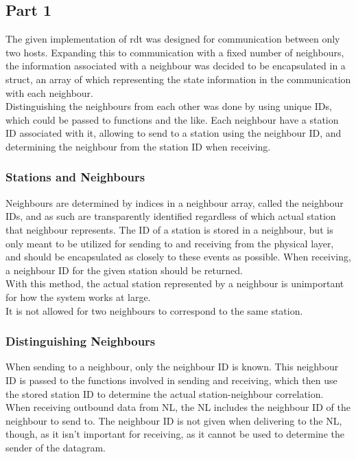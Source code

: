 \subsection{Part 1}
The given implementation of rdt was designed for communication between only two hosts. Expanding this to communication with a fixed number of neighbours, the information associated with a neighbour was decided to be encapsulated in a struct, an array of which representing the state information in the communication with each neighbour.\\
Distinguishing the neighbours from each other was done by using unique IDs, which could be passed to functions and the like. Each neighbour have a station ID associated with it, allowing to send to a station using the neighbour ID, and determining the neighbour from the station ID when receiving.

\subsubsection{Stations and Neighbours}
Neighbours are determined by indices in a neighbour array, called the neighbour IDs, and as such are transparently identified regardless of which actual station that neighbour represents. The ID of a station is stored in a neighbour, but is only meant to be utilized for sending to and receiving from the physical layer, and should be encapsulated as closely to these events as possible. When receiving, a neighbour ID for the given station should be returned.\\
With this method, the actual station represented by a neighbour is unimportant for how the system works at large.\\
It is not allowed for two neighbours to correspond to the same station.

%

\subsubsection{Distinguishing Neighbours}
When sending to a neighbour, only the neighbour ID is known. This neighbour ID is passed to the functions involved in sending and receiving, which then use the stored station ID to determine the actual station-neighbour correlation.\\
When receiving outbound data from NL, the NL includes the neighbour ID of the neighbour to send to. The neighbour ID is not given when delivering to the NL, though, as it isn't important for receiving, as it cannot be used to determine the sender of the datagram.

